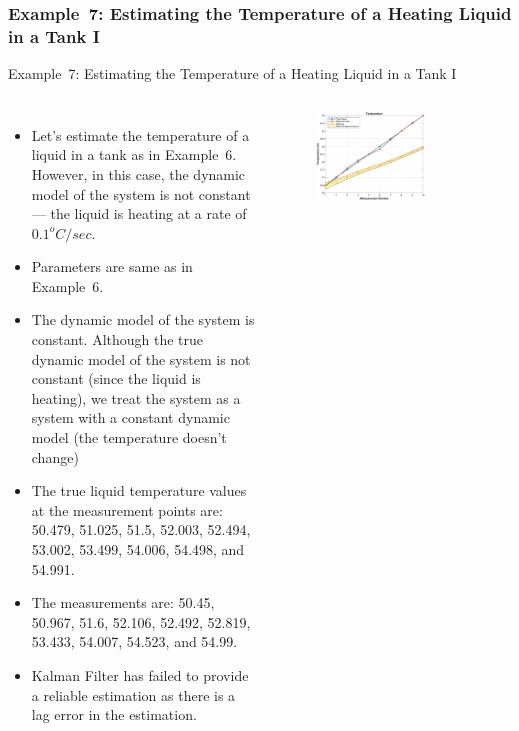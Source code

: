 \subsubsection{Example~7: Estimating the Temperature of a Heating Liquid in a Tank I} 
\begin{frame}{Example~7: Estimating the Temperature of a Heating Liquid in a Tank I} 
\begin{columns}
    \begin{itemize}
        \item Let's estimate the temperature of a liquid in a tank as in Example~6. However, in this case, the dynamic model of the system is not constant--- the liquid is heating at a rate of $0.1^oC/sec$.
        \item Parameters are same as in Example~6.
        \item The dynamic model of the system is constant. Although the true dynamic model of the system is not constant (since the liquid is heating), we treat the system as a system with a constant dynamic model (the temperature doesn't change)
        \item The true liquid temperature values at the measurement points are: 50.479, 51.025, 51.5, 52.003, 52.494, 53.002, 53.499, 54.006, 54.498, and 54.991.
        \item The measurements are: 50.45, 50.967, 51.6, 52.106, 52.492, 52.819, 53.433, 54.007, 54.523, and 54.99.
        \item Kalman Filter has failed to provide a reliable estimation as there is a lag error in the estimation.
    \end{itemize}    
    \vspace{-5pt}
    \begin{figure}
        \centering
        \includegraphics[width=0.7\textwidth]{Figures/Chapter1/ex7_KalmanFilter_ProcessNoise_I.eps}

\end{figure}
\end{columns}
\end{frame}
